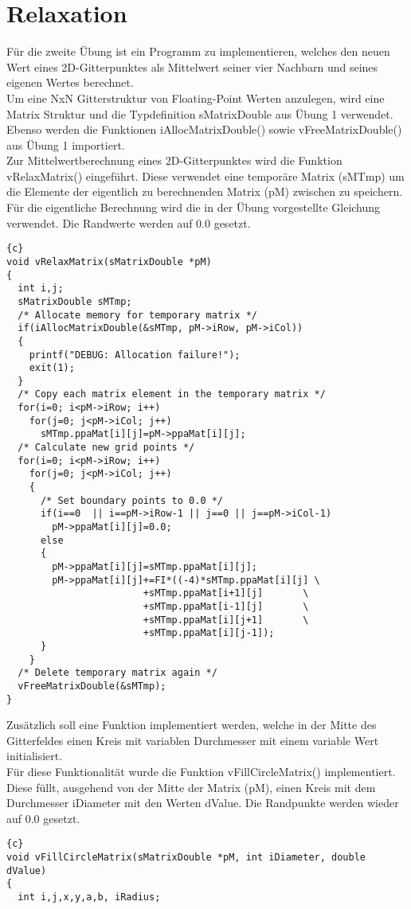 \documentclass{article}
\newcommand{\enterProblemHeader}[1]{
}
\newcommand{\exitProblemHeader}[1]{
}
\newcounter{homeworkProblemCounter} %
\newcommand{\homeworkProblemName}{}
\newenvironment{homeworkProblem}[1][Problem \arabic{homeworkProblemCounter}]{ %
\stepcounter{homeworkProblemCounter} %
\renewcommand{\homeworkProblemName}{#1} %
\section{\homeworkProblemName} %
}{
}
\begin{document}
\begin{homeworkProblem}[Relaxation]
Für die zweite Übung ist ein Programm zu implementieren, welches den neuen Wert eines
2D-Gitterpunktes als Mittelwert seiner vier Nachbarn und seines eigenen Wertes berechnet.
\\
Um eine NxN Gitterstruktur von Floating-Point Werten anzulegen, wird eine
Matrix Struktur und die Typdefinition sMatrixDouble aus Übung 1 verwendet. Ebenso
werden die Funktionen iAllocMatrixDouble() sowie vFreeMatrixDouble() aus Übung 1
importiert.
\\
Zur Mittelwertberechnung eines 2D-Gitterpunktes wird die Funktion vRelaxMatrix()
eingeführt. Diese verwendet eine temporäre Matrix (sMTmp) um die Elemente der
eigentlich zu berechnenden Matrix (pM) zwischen zu speichern. Für die eigentliche
Berechnung wird die in der Übung vorgestellte Gleichung verwendet. Die Randwerte
werden auf 0.0 gesetzt.
\begin{lstlisting}{c}
void vRelaxMatrix(sMatrixDouble *pM)
{
  int i,j;
  sMatrixDouble sMTmp;
  /* Allocate memory for temporary matrix */
  if(iAllocMatrixDouble(&sMTmp, pM->iRow, pM->iCol))
  {
    printf("DEBUG: Allocation failure!");
    exit(1);
  }
  /* Copy each matrix element in the temporary matrix */
  for(i=0; i<pM->iRow; i++)
    for(j=0; j<pM->iCol; j++)
      sMTmp.ppaMat[i][j]=pM->ppaMat[i][j];
  /* Calculate new grid points */
  for(i=0; i<pM->iRow; i++)
    for(j=0; j<pM->iCol; j++)
    {
      /* Set boundary points to 0.0 */
      if(i==0  || i==pM->iRow-1 || j==0 || j==pM->iCol-1)
        pM->ppaMat[i][j]=0.0;
      else
      {
        pM->ppaMat[i][j]=sMTmp.ppaMat[i][j];
        pM->ppaMat[i][j]+=FI*((-4)*sMTmp.ppaMat[i][j] \
                        +sMTmp.ppaMat[i+1][j]       \
                        +sMTmp.ppaMat[i-1][j]       \
                        +sMTmp.ppaMat[i][j+1]       \
                        +sMTmp.ppaMat[i][j-1]);
      }
    }
  /* Delete temporary matrix again */
  vFreeMatrixDouble(&sMTmp);
}
\end{lstlisting}
Zusätzlich soll eine Funktion implementiert werden, welche in der Mitte des Gitterfeldes
einen Kreis mit variablen Durchmesser mit einem variable Wert initialisiert. 
\\
Für diese Funktionalität wurde die Funktion vFillCircleMatrix() implementiert. Diese
füllt, ausgehend von der Mitte der Matrix (pM), einen Kreis mit dem Durchmesser
iDiameter mit den Werten dValue. Die Randpunkte werden wieder auf 0.0 gesetzt.
\begin{lstlisting}{c}
void vFillCircleMatrix(sMatrixDouble *pM, int iDiameter, double dValue)
{
  int i,j,x,y,a,b, iRadius;
  

\end{lstlisting}
\end{homeworkProblem}
\end{document}
